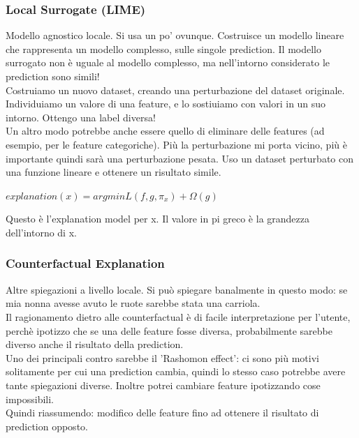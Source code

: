 \newpage 

\subsubsection{Local Surrogate (LIME)}
Modello agnostico locale. Si usa un po' ovunque. Costruisce un modello lineare che rappresenta un modello complesso, sulle singole prediction. Il modello surrogato non è uguale al modello complesso, ma nell'intorno considerato le prediction sono simili! 
\\
Costruiamo un nuovo dataset, creando una perturbazione del dataset originale. Individuiamo un valore di una feature, e lo sostiuiamo con valori in un suo intorno. Ottengo una label diversa! 
\\
Un altro modo potrebbe anche essere quello di eliminare delle features (ad esempio, per le feature categoriche). Più la perturbazione mi porta vicino, più è importante quindi sarà una perturbazione pesata. Uso un dataset perturbato con una funzione lineare e ottenere un risultato simile. 
\begin{center}
    \begin{math}
        explanation(x) = arg min L(f,g, \pi_x)+ \Omega(g)
    \end{math}
\end{center}
Questo è l'explanation model per x. Il valore in pi greco è la grandezza dell'intorno di x. 

\subsubsection{Counterfactual Explanation}
Altre spiegazioni a livello locale. Si può spiegare banalmente in questo modo: se mia nonna avesse avuto le ruote sarebbe stata una carriola. 
\\
Il ragionamento dietro alle counterfactual è di facile interpretazione per l'utente, perchè ipotizzo che se una delle feature fosse diversa, probabilmente sarebbe diverso anche il risultato della prediction. 
\\
Uno dei principali contro sarebbe il 'Rashomon effect': ci sono più motivi solitamente per cui una prediction cambia, quindi lo stesso caso potrebbe avere tante spiegazioni diverse. Inoltre potrei cambiare feature ipotizzando cose impossibili.
\\
Quindi riassumendo: modifico delle feature fino ad ottenere il risultato di prediction opposto. 

